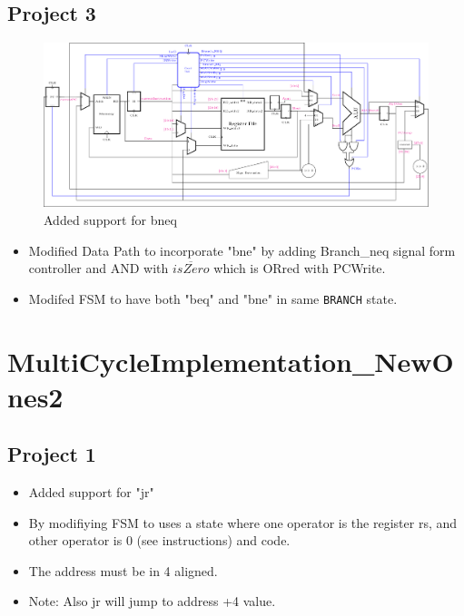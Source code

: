 \documentclass{article}
\begin{document}
\subsection*{Project 3}
\begin{figure}[H]
    \begin{center}
        \includegraphics[scale=0.7]{MultiCycleImplementation_NewOnes/TexFiles/MultiCycle_NewOnes3.pdf}
        \caption*{Added support for bneq}
    \end{center}
\end{figure}
\begin{itemize}
    \item Modified Data Path to incorporate "bne" by adding Branch\_neq signal form controller and AND with $\overline{isZero}$ which is ORred with PCWrite.
    \item Modifed FSM to have both "beq" and "bne" in same \verb|BRANCH| state.
\end{itemize}




\section*{MultiCycleImplementation\_NewOnes2}
\subsection*{Project 1}
\begin{itemize}
    \item Added support for "jr"
    \item By modifiying FSM to uses a state where one operator is the register rs, and other operator is 0 (see instructions) and code.
    \item The address must be in 4 aligned.
    \item Note: Also jr will jump to address +4 value.
\end{itemize}
\end{document}
